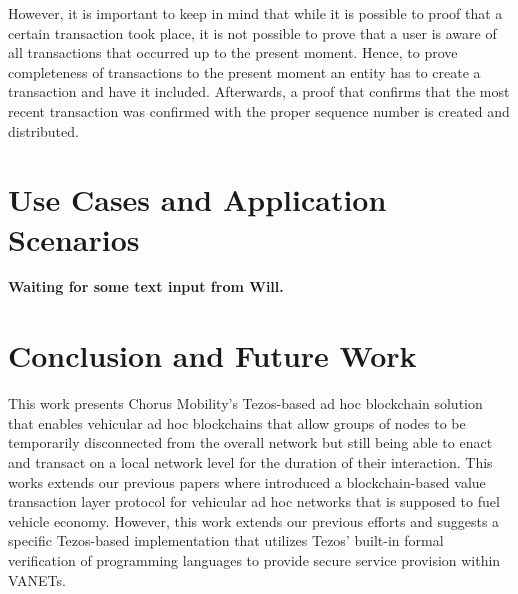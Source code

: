 \documentclass{llncs}
\begin{document}
{			However, it is important to keep in mind that while it is possible to proof that a certain transaction took place, it is not possible to prove that a user is aware of all transactions that occurred up to the present moment. Hence, to prove completeness of transactions to the present moment an entity has to create a transaction and have it included. Afterwards, a proof that confirms that the most recent transaction was confirmed with the proper sequence number is created and distributed. 

			

	
	\section{Use Cases and Application Scenarios}
		\label{s:section-5}	
	
		
		\textbf{Waiting for some text input from Will.}
	

	\section{Conclusion and Future Work}
		\label{s:section-6}	




		This work presents Chorus Mobility's Tezos-based ad hoc blockchain solution that enables vehicular ad hoc blockchains that allow groups of nodes to be temporarily disconnected from the overall network but still being able to enact and transact on a local network level for the duration of their interaction. This works extends our previous papers \cite{chorusWhitepaper}\cite{chorus2018MCIS} where introduced a blockchain-based value transaction layer protocol for vehicular ad hoc networks that is supposed to fuel vehicle economy. However, this work extends our previous efforts and suggests a specific Tezos-based implementation that utilizes Tezos' built-in formal verification of programming languages to provide secure service provision within VANETs.

}
\end{document}
